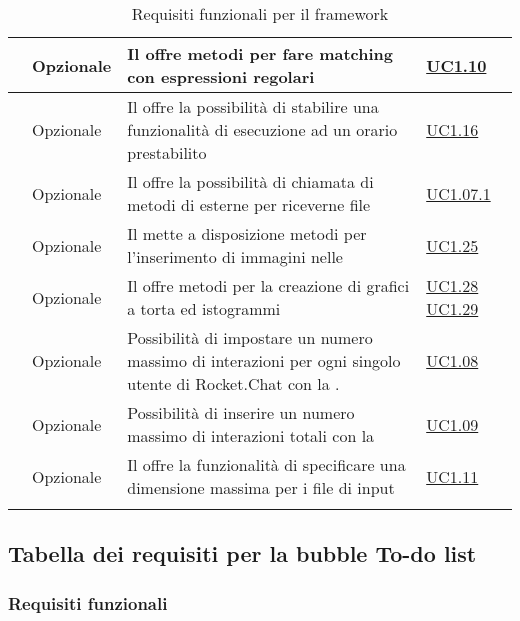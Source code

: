 \begin{longtable}{|P{1.5cm}|P{2.5cm}|P{6.5cm}|P{2.5cm}|}
	\hline \RequisitoOpF\label{L42} & Opzionale & Il  offre metodi per fare matching con espressioni regolari
	 & \hyperref[UC1.10]{UC1.10} \\
	\hline \RequisitoOpF\label{L43} & Opzionale & Il  offre la possibilità di stabilire una funzionalità di  esecuzione ad un orario prestabilito & \hyperref[UC1.16]{UC1.16} \\
	\hline \RequisitoOpF\label{L44} & Opzionale & Il  offre la possibilità di chiamata di metodi di  esterne per riceverne file  & \hyperref[UC1.07.1]{UC1.07.1} \\
	\hline \RequisitoOpF\label{L45} & Opzionale & Il  mette a disposizione metodi per l'inserimento di immagini nelle 
	 & \hyperref[UC1.25]{UC1.25} \\
	\hline \RequisitoOpF\label{L46} & Opzionale & Il  offre metodi per la creazione di grafici a torta ed istogrammi
	 & \hyperref[UC1.28]{UC1.28} \linebreak \hyperref[UC1.29]{UC1.29}  \\	 
	 \hline \RequisitoOpF\label{L47} & Opzionale & Possibilità di impostare un numero massimo di interazioni per ogni singolo utente di Rocket.Chat con la . & \hyperref[UC1.08]{UC1.08} \\
	 \hline \RequisitoOpF\label{L48} & Opzionale & Possibilità di inserire un numero massimo di interazioni totali con la  & \hyperref[UC1.09]{UC1.09} \\
	 \hline \RequisitoOpF\label{L49} & Opzionale & Il  offre la funzionalità di specificare una dimensione massima per i file di input & \hyperref[UC1.11]{UC1.11} \\
	\hline
	\caption{Requisiti funzionali per il framework}
\end{longtable}


\subsection{Tabella dei requisiti per la bubble To-do list}

\subsubsection{Requisiti funzionali}

